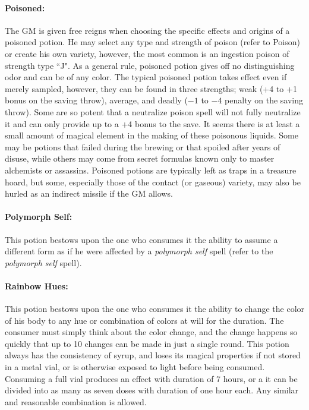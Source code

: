 \begin{multicols}{2}
\paragraph{Poisoned:} The GM is given free reigns when choosing the specific effects and origins of a poisoned potion.  He may select any type and strength of poison (refer to Poison) or create his own variety, however, the most common is an ingestion poison of strength type ``J".  As a general rule, poisoned potion gives off no distinguishing odor and can be of any color.  The typical poisoned potion takes effect even if merely sampled, however, they can be found in three strengths; weak (+4 to +1 bonus on the saving throw), average, and deadly ($-1$ to $-4$ penalty on the saving throw).  Some are so potent that a neutralize poison spell will not fully neutralize it and can only provide up to a +4 bonus to the save.  It seems there is at least a small amount of magical element in the making of these poisonous liquids.  Some may be potions that failed during the brewing or that spoiled after years of disuse, while others may come from secret formulas known only to master alchemists or assassins.  Poisoned potions are typically left as traps in a treasure hoard, but some, especially those of the contact (or gaseous) variety, may also be hurled as an indirect missile if the GM allows.

\paragraph{Polymorph Self:} This potion bestows upon the one who consumes it the ability to assume a different form as if he were affected by a \textit{polymorph self} spell (refer to the \textit{polymorph self} spell).  

\paragraph{Rainbow Hues:} This potion bestows upon the one who consumes it the ability to change the color of his body to any hue or combination of colors at will for the duration.  The consumer must simply think about the color change, and the change happens so quickly that up to 10 changes can be made in just a single round.  This potion always has the consistency of syrup, and loses its magical properties if not stored in a metal vial, or is otherwise exposed to light before being consumed.  Consuming a full vial produces an effect with duration of 7 hours, or a it can be divided into as many as seven doses with duration of one hour each.  Any similar and reasonable combination is allowed.


\end{multicols}
